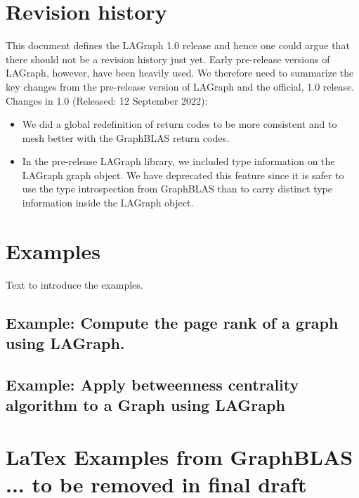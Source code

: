 \chapter{Revision history}
\label{Chp:RevHistory}

This document defines the LAGraph 1.0 release and hence one could argue that there should not be a
revision history just yet.    Early pre-release versions of LAGraph, however, have been heavily used.  
We therefore need to summarize the key changes from the pre-release version of LAGraph and 
the official, 1.0 release.  
Changes in 1.0 (Released: 12 September 2022):
\begin{itemize}
\item We did a global redefinition of return codes to be more consistent and to mesh better with the GraphBLAS
return codes.
\item In the pre-release LAGraph library, we included type information on the LAGraph graph object.  We have
deprecated this feature since it is safer to use the type introspection from GraphBLAS than to carry distinct type
information inside the LAGraph  object.
\end{itemize}



\chapter{Examples}
\label{Chp:Examples}

Text to introduce the examples.

\pagebreak
\nolinenumbers
\section{Example: Compute the page rank of a graph using LAGraph.}
{\scriptsize

}
\vfill

\pagebreak
\nolinenumbers
\section{Example: Apply betweenness centrality algorithm to a Graph using LAGraph}
{\scriptsize

}
\vfill

\linenumbers

\chapter{LaTex Examples from GraphBLAS ... to be removed in final draft}

